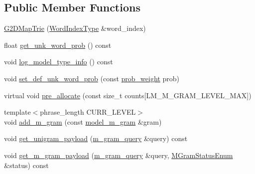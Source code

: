 \subsection*{Public Member Functions}
\begin{DoxyCompactItemize}
\item 
\hyperlink{classuva_1_1smt_1_1bpbd_1_1server_1_1lm_1_1_g2_d_map_trie_aebfc69c02990d4f3a6bd1f224f5d222a}{G2\+D\+Map\+Trie} (\hyperlink{classuva_1_1smt_1_1bpbd_1_1server_1_1lm_1_1_word_index_trie_base_a77ee32bf3a9f8a89558bda4f2031200c}{Word\+Index\+Type} \&word\+\_\+index)
\item 
float \hyperlink{classuva_1_1smt_1_1bpbd_1_1server_1_1lm_1_1_g2_d_map_trie_a76389d383e3e4f3bdde8e4e0a1bbd146}{get\+\_\+unk\+\_\+word\+\_\+prob} () const 
\item 
void \hyperlink{classuva_1_1smt_1_1bpbd_1_1server_1_1lm_1_1_g2_d_map_trie_a7a9a5e25adf379b62b3cc6574b72501b}{log\+\_\+model\+\_\+type\+\_\+info} () const 
\item 
void \hyperlink{classuva_1_1smt_1_1bpbd_1_1server_1_1lm_1_1_g2_d_map_trie_ab09a26ee0e33923e5c713a1301652e58}{set\+\_\+def\+\_\+unk\+\_\+word\+\_\+prob} (const \hyperlink{namespaceuva_1_1smt_1_1bpbd_1_1server_a01e9ea4de9c226f4464862e84ff0bbcc}{prob\+\_\+weight} prob)
\item 
virtual void \hyperlink{classuva_1_1smt_1_1bpbd_1_1server_1_1lm_1_1_g2_d_map_trie_aa85165b9233f8cbcf84d5a616b725e4e}{pre\+\_\+allocate} (const size\+\_\+t counts\mbox{[}L\+M\+\_\+\+M\+\_\+\+G\+R\+A\+M\+\_\+\+L\+E\+V\+E\+L\+\_\+\+M\+A\+X\mbox{]})
\item 
{\footnotesize template$<$phrase\+\_\+length C\+U\+R\+R\+\_\+\+L\+E\+V\+E\+L$>$ }\\void \hyperlink{classuva_1_1smt_1_1bpbd_1_1server_1_1lm_1_1_g2_d_map_trie_ac7bdc6ab9047144e1d12878e63eabe83}{add\+\_\+m\+\_\+gram} (const \hyperlink{classuva_1_1smt_1_1bpbd_1_1server_1_1lm_1_1m__grams_1_1model__m__gram}{model\+\_\+m\+\_\+gram} \&gram)
\item 
void \hyperlink{classuva_1_1smt_1_1bpbd_1_1server_1_1lm_1_1_g2_d_map_trie_a4fe590cb28465b83319879242c531685}{get\+\_\+unigram\+\_\+payload} (\hyperlink{classuva_1_1smt_1_1bpbd_1_1server_1_1lm_1_1m__gram__query}{m\+\_\+gram\+\_\+query} \&query) const 
\item 
void \hyperlink{classuva_1_1smt_1_1bpbd_1_1server_1_1lm_1_1_g2_d_map_trie_a9054274275cafa3549c48767a64fd609}{get\+\_\+m\+\_\+gram\+\_\+payload} (\hyperlink{classuva_1_1smt_1_1bpbd_1_1server_1_1lm_1_1m__gram__query}{m\+\_\+gram\+\_\+query} \&query, \hyperlink{namespaceuva_1_1smt_1_1bpbd_1_1server_1_1lm_ab9b3e7382b561dcb8abcd6b55e9b796a}{M\+Gram\+Status\+Enum} \&status) const 

\end{DoxyCompactItemize}
